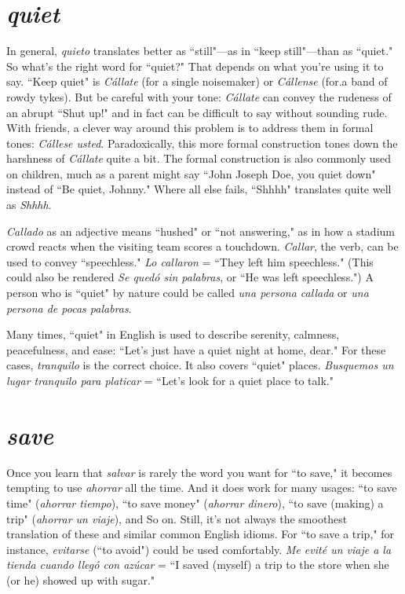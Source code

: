 \section{\emph{quiet}}

In general, \emph{quieto} translates better as ``still"---as in ``keep
still"---than as ``quiet." So what's the right word for ``quiet?" That
depends on what you're using it to say. ``Keep quiet" is \emph{Cállate} (for
a single noisemaker) or \emph{Cállense} (for.a band of rowdy tykes). But be
careful with your tone: \emph{Cállate} can convey the rudeness of an abrupt
``Shut up!" and in fact can be difficult to say without sounding rude.
With friends, a clever way around this problem is to address them in
formal tones: \emph{Cállese usted}. Paradoxically, this more formal construction tones down the harshness of \emph{Cállate} quite a bit. The formal construction is also commonly used on children, much as a parent might
say ``John Joseph Doe, you quiet down" instead of ``Be quiet, Johnny."
Where all else fails, ``Shhhh" translates quite well as \emph{Shhhh}.

\emph{Callado} as an adjective means ``hushed" or ``not answering,"
as in how a stadium crowd reacts when the visiting team scores a
touchdown. \emph{Callar}, the verb, can be used to convey ``speechless." \emph{Lo
callaron} = ``They left him speechless." (This could also be rendered
\emph{Se quedó sin palabras}, or ``He was left speechless.") A person who is
``quiet" by nature could be called \emph{una persona callada} or \emph{una persona de pocas palabras}.

Many times, ``quiet" in English is used to describe serenity,
calmness, peacefulness, and ease: ``Let's just have a quiet night at
home, dear." For these cases, \emph{tranquilo} is the correct choice. It also
covers ``quiet" places. \emph{Busquemos un lugar tranquilo para platicar} =
``Let's look for a quiet place to talk."

\section{\emph{save}}

Once you learn that \emph{salvar} is rarely the word you want for ``to
save," it becomes tempting to use \emph{ahorrar} all the time. And it does
work for many usages: ``to save time" (\emph{ahorrar tiempo}), ``to save
money" (\emph{ahorrar dinero}), ``to save (making) a trip" (\emph{ahorrar un viaje}),
and So on. Still, it's not always the smoothest translation of these and
similar common English idioms. For ``to save a trip," for instance, \emph{evitarse} (``to avoid") could be used comfortably. \emph{Me evité un viaje a la
tienda cuando llegó con azúcar} = ``I saved (myself) a trip to the store
when she (or he) showed up with sugar."


